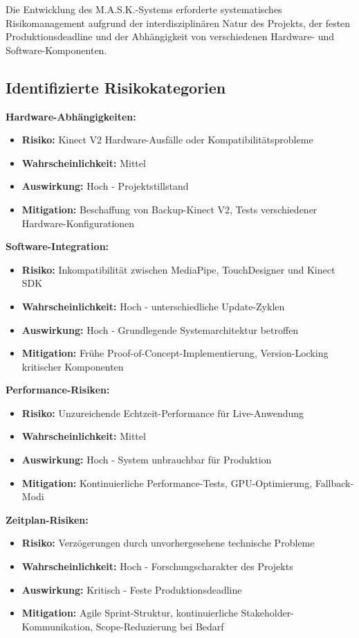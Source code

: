 Die Entwicklung des M.A.S.K.-Systems erforderte systematisches Risikomanagement aufgrund der interdisziplinären Natur des Projekts, der festen Produktionsdeadline und der Abhängigkeit von verschiedenen Hardware- und Software-Komponenten.

\subsection{Identifizierte Risikokategorien}

\textbf{Hardware-Abhängigkeiten:}
\begin{itemize}
    \item \textbf{Risiko:} Kinect V2 Hardware-Ausfälle oder Kompatibilitätsprobleme
    \item \textbf{Wahrscheinlichkeit:} Mittel
    \item \textbf{Auswirkung:} Hoch - Projektstillstand
    \item \textbf{Mitigation:} Beschaffung von Backup-Kinect V2, Tests verschiedener Hardware-Konfigurationen
\end{itemize}

\textbf{Software-Integration:}
\begin{itemize}
    \item \textbf{Risiko:} Inkompatibilität zwischen MediaPipe, TouchDesigner und Kinect SDK
    \item \textbf{Wahrscheinlichkeit:} Hoch - unterschiedliche Update-Zyklen
    \item \textbf{Auswirkung:} Hoch - Grundlegende Systemarchitektur betroffen
    \item \textbf{Mitigation:} Frühe Proof-of-Concept-Implementierung, Version-Locking kritischer Komponenten
\end{itemize}

\textbf{Performance-Risiken:}
\begin{itemize}
    \item \textbf{Risiko:} Unzureichende Echtzeit-Performance für Live-Anwendung
    \item \textbf{Wahrscheinlichkeit:} Mittel
    \item \textbf{Auswirkung:} Hoch - System unbrauchbar für Produktion
    \item \textbf{Mitigation:} Kontinuierliche Performance-Tests, GPU-Optimierung, Fallback-Modi
\end{itemize}

\textbf{Zeitplan-Risiken:}
\begin{itemize}
    \item \textbf{Risiko:} Verzögerungen durch unvorhergesehene technische Probleme
    \item \textbf{Wahrscheinlichkeit:} Hoch - Forschungscharakter des Projekts
    \item \textbf{Auswirkung:} Kritisch - Feste Produktionsdeadline
    \item \textbf{Mitigation:} Agile Sprint-Struktur, kontinuierliche Stakeholder-Kommunikation, Scope-Reduzierung bei Bedarf
\end{itemize}

